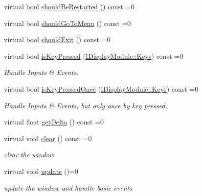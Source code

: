 \begin{DoxyCompactItemize}
virtual bool \hyperlink{class_i_display_module_ab3df0440b279e6e9ad631f43b61cb9ac}{should\+Be\+Restarted} () const =0
\item 
virtual bool \hyperlink{class_i_display_module_a305f8c4085dd4555c210f09e625395a8}{should\+Go\+To\+Menu} () const =0
\item 
virtual bool \hyperlink{class_i_display_module_a9ed6fcb0e0aaccc0da0617f96fe46582}{should\+Exit} () const =0
\item 
virtual bool \hyperlink{class_i_display_module_a1fdf2455de8a31974c89d7d2c717a8ef}{is\+Key\+Pressed} (\hyperlink{class_i_display_module_ac77668b52466bcd2dbd8446e5bfe412f}{I\+Display\+Module\+::\+Keys}) const =0
\begin{DoxyCompactList}\small\item\em Handle Inputs \& Events. \end{DoxyCompactList}\item 
virtual bool \hyperlink{class_i_display_module_a50c442d1c03f9f989e4500afa8a7294c}{is\+Key\+Pressed\+Once} (\hyperlink{class_i_display_module_ac77668b52466bcd2dbd8446e5bfe412f}{I\+Display\+Module\+::\+Keys}) const =0
\begin{DoxyCompactList}\small\item\em Handle Inputs \& Events, but only once by key pressed. \end{DoxyCompactList}\item 
virtual float \hyperlink{class_i_display_module_a21d9f0b15b586f53073c76e0d586bc88}{get\+Delta} () const =0
\item 
\mbox{\label{class_i_display_module_ad2572a5cce2065ac2772153b7056a1b7}} 
virtual void \hyperlink{class_i_display_module_ad2572a5cce2065ac2772153b7056a1b7}{clear} () const =0
\begin{DoxyCompactList}\small\item\em clear the window \end{DoxyCompactList}\item 
\mbox{\label{class_i_display_module_ab596639a32c5399c806ed95494cd8ddb}} 
virtual void \hyperlink{class_i_display_module_ab596639a32c5399c806ed95494cd8ddb}{update} ()=0
\begin{DoxyCompactList}\small\item\em update the window and handle basic events \end{DoxyCompactList}\item 
\mbox{\label{class_i_display_module_ae4a582ce9f12662c916c189bba12cdb7}} 

\end{DoxyCompactItemize}
